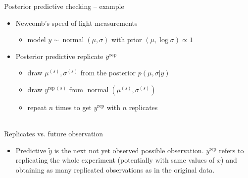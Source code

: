 \documentclass[t]{beamer}
\DeclareMathOperator{\normal}{normal}
\begin{document}
\begin{frame}{Posterior predictive checking -- example}

  \begin{itemize}
  \item<1-> Newcomb's speed of light measurements
    \begin{itemize}
    \item model $y\sim\normal(\mu,\sigma)$ with prior $(\mu,\log\sigma)\propto 1$
    \end{itemize}
  \item<2-> Posterior predictive replicate $y^{\rm rep}$
    \begin{itemize}
    \item<3-> draw $\mu^{(s)},\sigma^{(s)}$ from the posterior $p(\mu,\sigma|y)$
    \item<4-> draw $y^{\mathrm{rep}\,(s)}$ from $\normal(\mu^{(s)},\sigma^{(s)})$
    \item<5-> repeat $n$ times to get $y^{\mathrm{rep}}$ with $n$ replicates\\~\\
      \end{itemize}
    \end{itemize}

\end{frame}

\begin{frame}{Replicates vs. future observation}

  \begin{itemize}
  \item Predictive $\tilde{y}$ is the next not yet observed possible
    observation. $y^{\mathrm{rep}}$ refers to replicating the whole
    experiment (potentially with same values of $x$) and obtaining as
    many replicated observations as in the original data.
  \end{itemize}

\end{frame}
\end{document}
